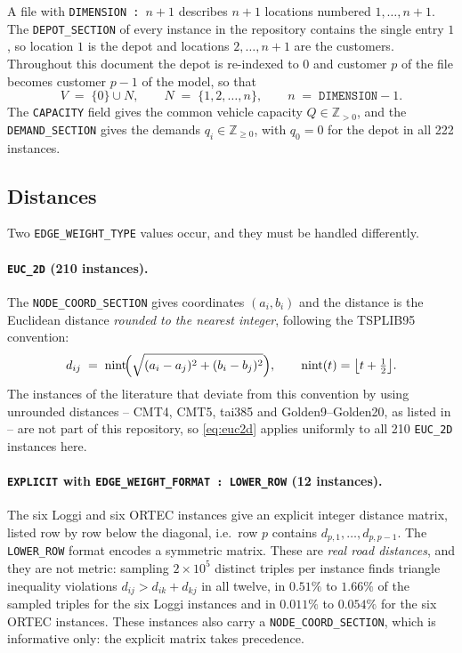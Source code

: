 \documentclass[11pt,a4paper]{article}
\theoremstyle{definition}
\theoremstyle{plain}
\newcommand{\Z}{\mathbb{Z}}
\newcommand{\Cust}{N}
\newcommand{\Nodes}{V}
\newcommand{\nint}{\operatorname{nint}}
\begin{document}
A file with \texttt{DIMENSION~:~$n+1$} describes $n+1$ locations numbered
$1,\dots,n+1$.  The \texttt{DEPOT\_SECTION} of every instance in the repository
contains the single entry $1$, so location $1$ is the depot and locations
$2,\dots,n+1$ are the customers.  Throughout this document the depot is
re-indexed to $0$ and customer $p$ of the file becomes customer $p-1$ of the
model, so that
\begin{equation}
  \Nodes \;=\; \{0\} \cup \Cust, \qquad \Cust \;=\; \{1,2,\dots,n\},
  \qquad n \;=\; \texttt{DIMENSION} - 1 .
  \label{eq:nodes}
\end{equation}
The \texttt{CAPACITY} field gives the common vehicle capacity $Q \in \Z_{>0}$,
and the \texttt{DEMAND\_SECTION} gives the demands $q_i \in \Z_{\ge 0}$, with
$q_0 = 0$ for the depot in all \num{222} instances.

\subsection{Distances}
\label{sec:distances}

Two \texttt{EDGE\_WEIGHT\_TYPE} values occur, and they must be handled
differently.

\paragraph{\texttt{EUC\_2D} (\num{210} instances).}
The \texttt{NODE\_COORD\_SECTION} gives coordinates $(a_i,b_i)$ and the
distance is the Euclidean distance \emph{rounded to the nearest integer},
following the TSPLIB95 convention:
\begin{equation}
  d_{ij} \;=\; \nint\!\Bigl( \sqrt{(a_i-a_j)^2 + (b_i-b_j)^2} \Bigr),
  \qquad \nint(t) = \bigl\lfloor t + \tfrac{1}{2} \bigr\rfloor .
  \label{eq:euc2d}
\end{equation}
The instances of the literature that deviate from this convention by using
unrounded distances -- \textsf{CMT4}, \textsf{CMT5}, \textsf{tai385} and
\textsf{Golden9}--\textsf{Golden20}, as listed in \cite{DIMACS2021} -- are not
part of this repository, so \eqref{eq:euc2d} applies uniformly to all
\num{210} \texttt{EUC\_2D} instances here.

\paragraph{\texttt{EXPLICIT} with \texttt{EDGE\_WEIGHT\_FORMAT~:~LOWER\_ROW}
(\num{12} instances).}
The six \textsf{Loggi} and six \textsf{ORTEC} instances give an explicit
integer distance matrix, listed row by row below the diagonal, i.e.\ row $p$
contains $d_{p,1},\dots,d_{p,p-1}$.  The \texttt{LOWER\_ROW} format encodes a
symmetric matrix.  These are \emph{real road distances}, and they are not
metric: sampling $2\times 10^{5}$ distinct triples per instance finds triangle
inequality violations $d_{ij} > d_{ik} + d_{kj}$ in all twelve, in
$0.51\%$ to $1.66\%$ of the sampled triples for the six \textsf{Loggi}
instances and in $0.011\%$ to $0.054\%$ for the six \textsf{ORTEC} instances.  These instances also carry a
\texttt{NODE\_COORD\_SECTION}, which is informative only: the explicit matrix
takes precedence.
\end{document}
